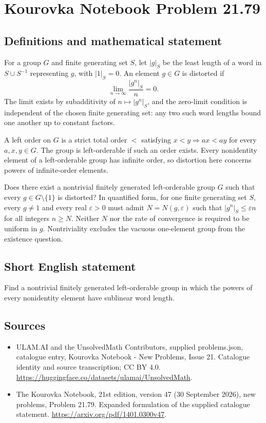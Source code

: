 \documentclass[11pt,a4paper]{article}
\begin{document}
\section*{Kourovka Notebook Problem 21.79}\label{statement}

\subsection{Definitions and mathematical statement}
For a group $G$ and finite generating set $S$, let $|g|_S$ be the least length of a word in $S\cup S^{-1}$ representing $g$, with $|1|_S=0$. An element $g\in G$ is distorted if
\[
 \lim_{n\to\infty}\frac{|g^n|_S}{n}=0.
\]
The limit exists by subadditivity of $n\mapsto|g^n|_S$, and the zero-limit condition is independent of the chosen finite generating set: any two such word lengths bound one another up to constant factors.

A left order on $G$ is a strict total order $<$ satisfying $x<y\Rightarrow ax<ay$ for every $a,x,y\in G$. The group is left-orderable if such an order exists. Every nonidentity element of a left-orderable group has infinite order, so distortion here concerns powers of infinite-order elements.

Does there exist a nontrivial finitely generated left-orderable group $G$ such that every $g\in G\setminus\{1\}$ is distorted? In quantified form, for one finite generating set $S$, every $g\ne1$ and every real $\varepsilon>0$ must admit $N=N(g,\varepsilon)$ such that $|g^n|_S\le\varepsilon n$ for all integers $n\ge N$. Neither $N$ nor the rate of convergence is required to be uniform in $g$. Nontriviality excludes the vacuous one-element group from the existence question.
\subsection{Short English statement}
Find a nontrivial finitely generated left-orderable group in which the powers of every nonidentity element have sublinear word length.
\subsection{Sources}
\begin{itemize}
\item[S1] ULAM.AI and the UnsolvedMath Contributors, supplied problems.json, catalogue entry, Kourovka Notebook - New Problems, Issue 21. Catalogue identity and source transcription; CC BY 4.0.
\url{https://huggingface.co/datasets/ulamai/UnsolvedMath}.
\item[S2] The Kourovka Notebook, 21st edition, version 47 (30 September 2026), new problems, Problem 21.79. Expanded formulation of the supplied catalogue statement.
\url{https://arxiv.org/pdf/1401.0300v47}.
\end{itemize}
\end{document}
